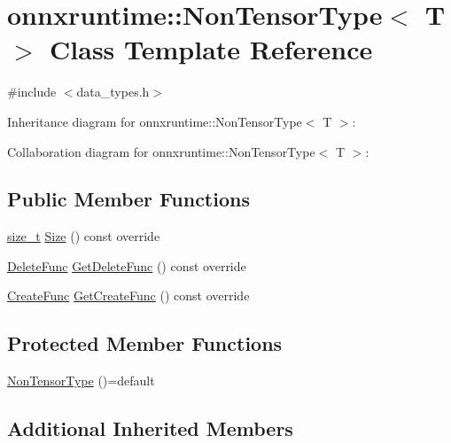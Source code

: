 \hypertarget{classonnxruntime_1_1NonTensorType}{}\section{onnxruntime\+:\+:Non\+Tensor\+Type$<$ T $>$ Class Template Reference}
\label{classonnxruntime_1_1NonTensorType}


{\ttfamily \#include $<$data\+\_\+types.\+h$>$}



Inheritance diagram for onnxruntime\+:\+:Non\+Tensor\+Type$<$ T $>$\+:


Collaboration diagram for onnxruntime\+:\+:Non\+Tensor\+Type$<$ T $>$\+:
\subsection*{Public Member Functions}
\begin{DoxyCompactItemize}
\item 
\mbox{\hyperlink{mlasi_8h_a503efbc1c6e50825320ad909366b78ab}{size\+\_\+t}} \mbox{\hyperlink{classonnxruntime_1_1NonTensorType_a514c297618cdb975d4f98a5b47321086}{Size}} () const override
\item 
\mbox{\hyperlink{namespaceonnxruntime_a8dcea0e1aa8476e3d09d5a44a0ca4516}{Delete\+Func}} \mbox{\hyperlink{classonnxruntime_1_1NonTensorType_a5220a1a535891fcb0079befd7391062f}{Get\+Delete\+Func}} () const override
\item 
\mbox{\hyperlink{namespaceonnxruntime_a4e4e007092b50ccad0f64e24d7ac3c1e}{Create\+Func}} \mbox{\hyperlink{classonnxruntime_1_1NonTensorType_aa42f5f4e125f8f0b385258cc6f27e9f8}{Get\+Create\+Func}} () const override
\end{DoxyCompactItemize}
\subsection*{Protected Member Functions}
\begin{DoxyCompactItemize}
\item 
\mbox{\hyperlink{classonnxruntime_1_1NonTensorType_a012356a54118f7ca3f429aa5c7ad38f2}{Non\+Tensor\+Type}} ()=default
\end{DoxyCompactItemize}
\subsection*{Additional Inherited Members}


